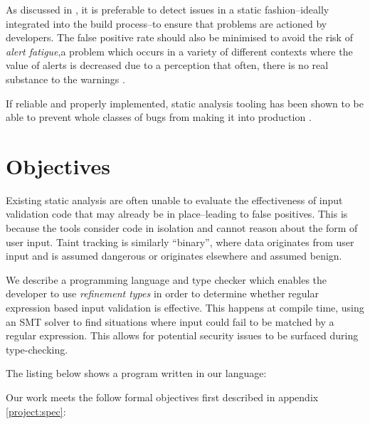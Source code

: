 As discussed in \citet{sadowski2018lessons}, it is preferable to detect issues in a static fashion--ideally integrated
into the build process--to ensure that problems are actioned by developers.
The false positive rate should also be minimised to avoid the risk of \emph{alert fatigue},a problem which occurs in a
variety of different contexts where the value of alerts is decreased due to a perception that often, there is no real
substance to the warnings \citep{kesselheim2011clinical}.

If reliable and properly implemented, static analysis tooling has been shown to be able to prevent whole classes of
bugs from making it into production \citep{sadowski2018lessons}.

\section{Objectives}

Existing static analysis are often unable to evaluate the effectiveness of input validation code that may already be in
place--leading to false positives.
This is because the tools consider code in isolation and cannot reason about the form of user input.
Taint tracking is similarly ``binary'', where data originates from user input and is assumed dangerous or originates
elsewhere and assumed benign.

We describe a programming language and type checker which enables the developer to use \emph{refinement types} in order to determine whether regular expression based
input validation is effective.
This happens at compile time, using an SMT solver to find situations where input could fail to be matched by a regular
expression.
This allows for potential security issues to be surfaced during type-checking.

The listing below shows a program written in our language:


Our work meets the follow formal objectives first described in appendix \ref{project:spec}:

